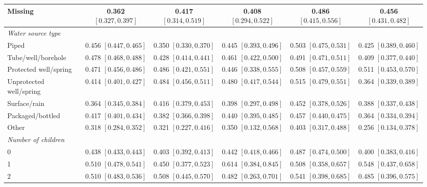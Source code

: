 \begin{landscape}
\begin{longtable}{lccccc}
Missing & 0.362 {\scriptsize$[0.327,0.397]$} & 0.417 {\scriptsize$[0.314,0.519]$} & 0.408 {\scriptsize$[0.294,0.522]$} & 0.486 {\scriptsize$[0.415,0.556]$} & 0.456 {\scriptsize$[0.431,0.482]$} \\
\midrule
\multicolumn{6}{l}{\textit{Water source type}} \\
Piped & 0.456 {\scriptsize$[0.447,0.465]$} & 0.350 {\scriptsize$[0.330,0.370]$} & 0.445 {\scriptsize$[0.393,0.496]$} & 0.503 {\scriptsize$[0.475,0.531]$} & 0.425 {\scriptsize$[0.389,0.460]$} \\
Tube/well/borehole & 0.478 {\scriptsize$[0.468,0.488]$} & 0.428 {\scriptsize$[0.414,0.441]$} & 0.461 {\scriptsize$[0.422,0.500]$} & 0.491 {\scriptsize$[0.471,0.511]$} & 0.409 {\scriptsize$[0.377,0.440]$} \\
Protected well/spring & 0.471 {\scriptsize$[0.456,0.486]$} & 0.486 {\scriptsize$[0.421,0.551]$} & 0.446 {\scriptsize$[0.338,0.555]$} & 0.508 {\scriptsize$[0.457,0.559]$} & 0.511 {\scriptsize$[0.453,0.570]$} \\
Unprotected well/spring & 0.414 {\scriptsize$[0.401,0.427]$} & 0.484 {\scriptsize$[0.456,0.511]$} & 0.480 {\scriptsize$[0.417,0.544]$} & 0.515 {\scriptsize$[0.479,0.551]$} & 0.364 {\scriptsize$[0.339,0.389]$} \\
Surface/rain & 0.364 {\scriptsize$[0.345,0.384]$} & 0.416 {\scriptsize$[0.379,0.453]$} & 0.398 {\scriptsize$[0.297,0.498]$} & 0.452 {\scriptsize$[0.378,0.526]$} & 0.388 {\scriptsize$[0.337,0.438]$} \\
Packaged/bottled & 0.417 {\scriptsize$[0.401,0.434]$} & 0.382 {\scriptsize$[0.366,0.398]$} & 0.440 {\scriptsize$[0.395,0.485]$} & 0.457 {\scriptsize$[0.440,0.475]$} & 0.364 {\scriptsize$[0.334,0.394]$} \\
Other & 0.318 {\scriptsize$[0.284,0.352]$} & 0.321 {\scriptsize$[0.227,0.416]$} & 0.350 {\scriptsize$[0.132,0.568]$} & 0.403 {\scriptsize$[0.317,0.488]$} & 0.256 {\scriptsize$[0.134,0.378]$} \\
\midrule
\multicolumn{6}{l}{\textit{Number of children}} \\
0 & 0.438 {\scriptsize$[0.433,0.443]$} & 0.403 {\scriptsize$[0.392,0.413]$} & 0.442 {\scriptsize$[0.418,0.466]$} & 0.487 {\scriptsize$[0.474,0.500]$} & 0.400 {\scriptsize$[0.383,0.416]$} \\
1 & 0.510 {\scriptsize$[0.478,0.541]$} & 0.450 {\scriptsize$[0.377,0.523]$} & 0.614 {\scriptsize$[0.384,0.845]$} & 0.508 {\scriptsize$[0.358,0.657]$} & 0.548 {\scriptsize$[0.437,0.658]$} \\
2 & 0.510 {\scriptsize$[0.483,0.536]$} & 0.508 {\scriptsize$[0.445,0.570]$} & 0.482 {\scriptsize$[0.263,0.701]$} & 0.541 {\scriptsize$[0.398,0.685]$} & 0.485 {\scriptsize$[0.396,0.575]$} \\

\end{longtable}
\end{landscape}
